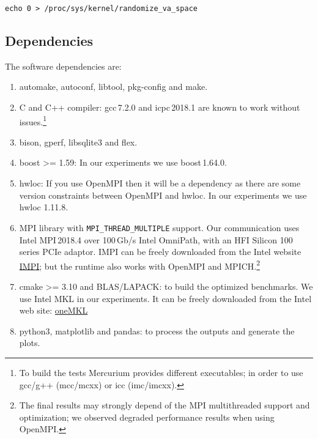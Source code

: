 \documentclass{article}
\newcommand{\code}[1]{\texttt{#1}}
\begin{document}
\begin{lstlisting}
echo 0 > /proc/sys/kernel/randomize_va_space
\end{lstlisting}

\subsection{Dependencies}

The software dependencies are:

\begin{enumerate}
    \item automake, autoconf, libtool, pkg-config and make.

    \item C and C++ compiler:  gcc\,7.2.0 and icpc\,2018.1 are known to work without
        issues.\footnote{To build the tests Mercurium provides different executables;
        in order to use gcc/g++ (mcc/mcxx) or icc (imc/imcxx).}

    \item bison, gperf, libsqlite3 and flex.

    \item boost >= 1.59: In our experiments we use boost\,1.64.0.

    \item hwloc: If you use OpenMPI then it will be a dependency as there are some
        version constraints between OpenMPI and hwloc. In our experiments we use
        hwloc 1.11.8.

    \item MPI library with \code{MPI\_THREAD\_MULTIPLE} support. Our communication
        uses Intel MPI\,2018.4 over 100\,Gb/s Intel OmniPath, with an HFI Silicon
        100 series PCIe adaptor.  IMPI can be freely downloaded from the Intel
        website \href{https://www.intel.com/content/www/us/en/developer/tools/oneapi/mpi-library.html}{IMPI};
        but the runtime also works with OpenMPI and MPICH.\footnote{The final results may strongly depend of the MPI multithreaded
        support and optimization; we observed degraded performance results
        when using OpenMPI.}

    \item cmake >= 3.10 and BLAS/LAPACK: to build the optimized benchmarks.
        We use Intel MKL in our experiments. It can be freely
        downloaded from the Intel web site:
        \href{https://www.intel.com/content/www/us/en/developer/tools/oneapi/onemkl-download.html}{oneMKL}

    \item python3, matplotlib and pandas: to process the outputs and generate the plots.

\end{enumerate}
\end{document}

